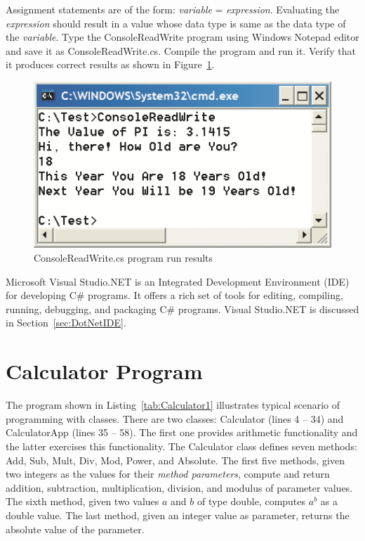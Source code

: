 Assignment statements are of the form: \emph{variable} =
\emph{expression}. Evaluating the \emph{expression} should result
in a value whose data type is same as the data type of the
\emph{variable}. Type the ConsoleReadWrite program using Windows
Notepad editor and save it as ConsoleReadWrite.cs. Compile the
program and run it. Verify that it produces correct results as
shown in Figure~\ref{fig:ConsoleReadWriteOut}.

\begin{figure}
\centering
\includegraphics[scale=0.65]{./CSharpBasics/Illus/ConsoleReadWriteOut}
\caption{ConsoleReadWrite.cs program run results}
\label{fig:ConsoleReadWriteOut}
\end{figure}

Microsoft Visual Studio.NET is an Integrated Development
Environment (IDE) for developing C\# programs. It offers a rich
set of tools for editing, compiling, running, debugging, and
packaging C\# programs. Visual Studio.NET is discussed in
Section~\ref{sec:DotNetIDE}.


{\samepage\vspace{1ex}\noindent\usebox{\phicsep}\vspace{1.5ex}}
\vspace{-0.4in}
\section{Calculator Program} \label{sec:CalculatorProg}



The program shown in Listing~\ref{tab:Calculator1} illustrates
typical scenario of programming with classes. There are two
classes: Calculator (lines 4 -- 34) and CalculatorApp (lines 35 --
58). The first one provides arithmetic functionality and the
latter exercises this functionality. The Calculator class defines
seven methods: Add, Sub, Mult, Div, Mod, Power, and Absolute. The
first five methods, given two integers as the values for their
\emph{method parameters}, compute and return addition,
subtraction, multiplication, division, and modulus of parameter
values. The sixth method, given two values $a$ and $b$ of type
double, computes $a^b$ as a double value. The last method, given
an integer value as parameter, returns the absolute value of the
parameter.




